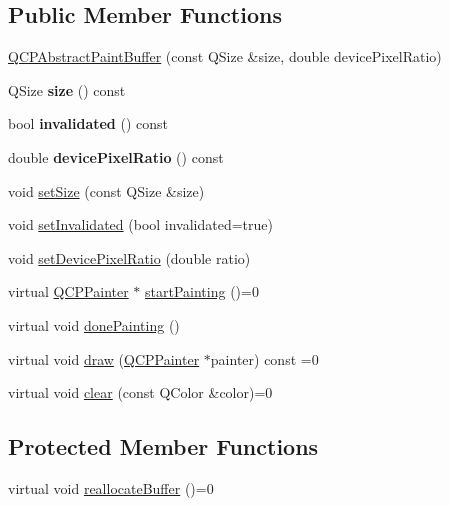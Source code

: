\subsection*{Public Member Functions}
\begin{DoxyCompactItemize}
\item 
\hyperlink{class_q_c_p_abstract_paint_buffer_a3ce532c12f10b81697108835755641e2}{Q\+C\+P\+Abstract\+Paint\+Buffer} (const Q\+Size \&size, double device\+Pixel\+Ratio)
\item 
\mbox{\label{class_q_c_p_abstract_paint_buffer_a3ea8284e547985c5d263f26a6adfa11f}} 
Q\+Size {\bfseries size} () const
\item 
\mbox{\label{class_q_c_p_abstract_paint_buffer_a76bf771cda945a6c602cf9b7d365d92b}} 
bool {\bfseries invalidated} () const
\item 
\mbox{\label{class_q_c_p_abstract_paint_buffer_aac1b981f8c1744036610ff1a6b9461f9}} 
double {\bfseries device\+Pixel\+Ratio} () const
\item 
void \hyperlink{class_q_c_p_abstract_paint_buffer_a8b68c3cd36533f1a4a23b5ce8cd66f01}{set\+Size} (const Q\+Size \&size)
\item 
void \hyperlink{class_q_c_p_abstract_paint_buffer_ae4c7dc70dfc66be2879ce297b2b3d67f}{set\+Invalidated} (bool invalidated=true)
\item 
void \hyperlink{class_q_c_p_abstract_paint_buffer_a555eaad5d5c806420ff35602a1bb68fa}{set\+Device\+Pixel\+Ratio} (double ratio)
\item 
virtual \hyperlink{class_q_c_p_painter}{Q\+C\+P\+Painter} $\ast$ \hyperlink{class_q_c_p_abstract_paint_buffer_a9e9f29b19c033cf02fb96f1a148463f3}{start\+Painting} ()=0
\item 
virtual void \hyperlink{class_q_c_p_abstract_paint_buffer_a41b0dc6e7744f19fae09f8532c207dc1}{done\+Painting} ()
\item 
virtual void \hyperlink{class_q_c_p_abstract_paint_buffer_afb998c7525e3ae37d9d2d46c7aaf461a}{draw} (\hyperlink{class_q_c_p_painter}{Q\+C\+P\+Painter} $\ast$painter) const =0
\item 
virtual void \hyperlink{class_q_c_p_abstract_paint_buffer_a9e253f4541dfc01992b77e8830bd7722}{clear} (const Q\+Color \&color)=0
\end{DoxyCompactItemize}
\subsection*{Protected Member Functions}
\begin{DoxyCompactItemize}
\item 
virtual void \hyperlink{class_q_c_p_abstract_paint_buffer_aee7506a52bd7e5a07c2af27935eb13e7}{reallocate\+Buffer} ()=0
\end{DoxyCompactItemize}
